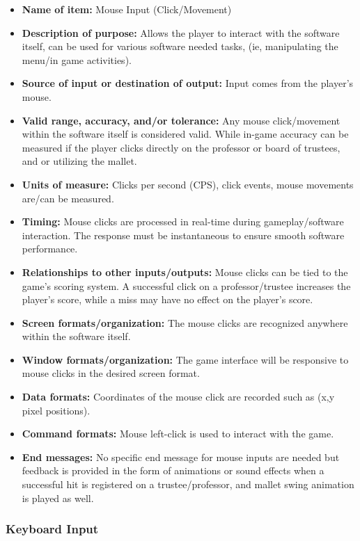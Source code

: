 \documentclass{article}
\begin{document}
\begin{itemize}
    \item \textbf{Name of item:} Mouse Input (Click/Movement)
    \item \textbf{Description of purpose:} Allows the player to interact with the software itself, can be used for various software needed tasks, (ie, manipulating the menu/in game activities).
    \item \textbf{Source of input or destination of output:} Input comes from the player’s mouse.
    \item \textbf{Valid range, accuracy, and/or tolerance:} Any mouse click/movement within the software itself is considered valid. While in-game accuracy can be measured if the player clicks directly on the professor or board of trustees, and or utilizing the mallet.
    \item \textbf{Units of measure:} Clicks per second (CPS), click events, mouse movements are/can be measured.
    \item \textbf{Timing:} Mouse clicks are processed in real-time during gameplay/software interaction. The response must be instantaneous to ensure smooth software performance.
    \item \textbf{Relationships to other inputs/outputs:} Mouse clicks can be tied to the game’s scoring system. A successful click on a professor/trustee increases the player’s score, while a miss may have no effect on the player's score.
    \item \textbf{Screen formats/organization:} The mouse clicks are recognized anywhere within the software itself.
    \item \textbf{Window formats/organization:} The game interface will be responsive to mouse clicks in the desired screen format.
    \item \textbf{Data formats:} Coordinates of the mouse click are recorded such as (x,y pixel positions).
    \item \textbf{Command formats:} Mouse left-click is used to interact with the game.
    \item \textbf{End messages:} No specific end message for mouse inputs are needed but feedback is provided in the form of animations or sound effects when a successful hit is registered on a trustee/professor, and mallet swing animation is played as well.
\end{itemize}

\subsubsection{Keyboard Input}
\end{document}
